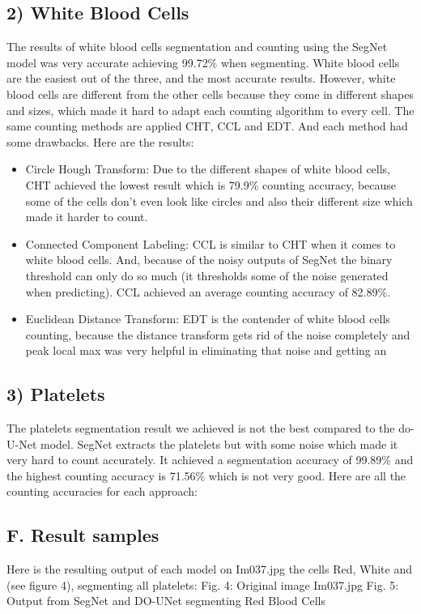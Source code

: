 \documentclass[conference]{IEEEtran}
\begin{document}
\subsection{2) White Blood Cells}
The results of white blood cells segmentation and counting using the SegNet model was very accurate achieving 99.72\% when segmenting. White blood cells are the easiest out of the three, and the most accurate results. However, white blood cells are different from the other cells because they come in different shapes and sizes, which made it hard to adapt each counting algorithm to every cell. The same counting methods are applied CHT, CCL and EDT. And each method had some drawbacks. Here are the results:
\begin{itemize}
\item Circle Hough Transform: Due to the different shapes of white blood cells, CHT achieved the lowest result which is 79.9\% counting accuracy, because some of the cells don’t even look like circles and also their different size which made it harder to count.
\item Connected Component Labeling: CCL is similar to CHT when it comes to white blood cells. And, because of the noisy outputs of SegNet the binary threshold can only do so much (it thresholds some of the noise generated when predicting). CCL achieved an average counting accuracy of 82.89\%.
\item Euclidean Distance Transform: EDT is the contender of white blood cells counting, because the distance transform gets rid of the noise completely and peak local max was very helpful in eliminating that noise and getting an
\end{itemize}
\subsection{3) Platelets}
The platelets segmentation result we achieved is not the best compared to the do-U-Net model. SegNet extracts the platelets but with some noise which made it very hard to count accurately. It achieved a segmentation accuracy of 99.89\% and the highest counting accuracy is 71.56\% which is not very good. Here are all the counting accuracies for each approach:
\subsection{F. Result samples}
Here is the resulting output of each model on Im037.jpg the cells Red, White and 
(see figure 4), segmenting all platelets:
Fig. 4: Original image Im037.jpg
Fig. 5: Output from SegNet and DO-UNet segmenting Red Blood Cells
\end{document}
